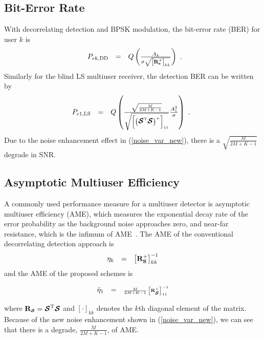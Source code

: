 \documentclass[conference]{IEEEtran}
\newcommand{\bs}{{\bf s}}
\newcommand{\bS}{{\bf S}}
\newcommand{\bR}{{\bf R}}
\newcommand{\bcS}{{\mbox {\boldmath ${\cal S}$}}}
\begin{document}
\subsection{Bit-Error Rate}
With decorrelating detection and BPSK modulation, the bit-error
rate (BER) for user $k$ is
\begin{equation}
\begin{array}{rcl}
P_{ek,\rm\small DD} &=&
Q\left(\frac{A_{k}}{\sigma\sqrt{\left[\bR_{\bs}^{+}\right]_{kk}}}\right)
\end{array}.\label{BER_DD}
\end{equation}
\noindent Similarly for the blind LS multiuser receiver, the
detection BER can be written by
\begin{equation}\hspace{-0.07in}
\begin{array}{rcl}
P_{e1,\rm\small LS} &=&
Q\left(\frac{\sqrt{\frac{M}{2M+K-1}}}{\sqrt{\left[\left(\bcS^{\rm
T}\bcS\right)^{+}\right]_{11}}}\frac{A_1^2}{\sigma}\right)\ .
\end{array}\label{BER_LS}
\end{equation}
\noindent Due to the noise enhancement effect in
(\ref{noise_var_new}), there is a $\sqrt{\frac{M}{2M+K-1}}$
degrade in SNR.

\subsection{Asymptotic Multiuser Efficiency}
A commonly used performance measure for a multiuser detector is
asymptotic multiuser efficiency (AME), which measures the
exponential decay rate of the error probability as the background
noise approaches zero, and near-far resistance, which is the
infimum of AME~\cite{Verd98}. The AME of the conventional
decorrelating detection approach is
\begin{equation}
\begin{array}{rcl}
{\eta}_k&=&\left[\bR_{\bS}^{+}\right]_{kk}^{-1}
\end{array}
\end{equation}
\noindent and the AME of the proposed schemes is

\begin{equation}
\begin{array}{rcl}
{{\bar{\eta}}_1}&=&\frac{M}{2M+K-1}\left[\bR_{\tiny\bcS}^{+}\right]_{11}^{-1}
\end{array}
\end{equation}

\noindent where $\bR_{\tiny\bcS}=\bcS^{\rm T}\bcS$ and
$\left[\cdot\right]_{kk}$ denotes the $k$th diagonal element of
the matrix. Because of the new noise enhancement shown in
(\ref{noise_var_new}), we can see that there is a degrade,
${\frac{M}{2M+K-1}}$, of AME.
\end{document}

